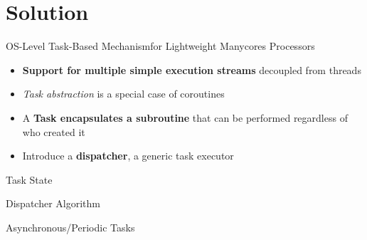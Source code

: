 \section{Solution}

	\begin{frame}{OS-Level Task-Based Mechanism}{for Lightweight Manycores Processors}
		\begin{itemize}
			\setlength\itemsep{5mm}
			\item \textbf{Support for multiple simple execution streams}
				decoupled from threads
			\item \textit{Task abstraction} is a special case of coroutines
			\item A \textbf{Task encapsulates a subroutine} that can be performed regardless
				of who created it
			\item Introduce a \textbf{dispatcher}, a generic task executor
		\end{itemize}
	\end{frame}

	\begin{frame}{Task State}
	\end{frame}

	\begin{frame}{Dispatcher Algorithm}
	\end{frame}

	\begin{frame}{Asynchronous/Periodic Tasks}
	\end{frame}

